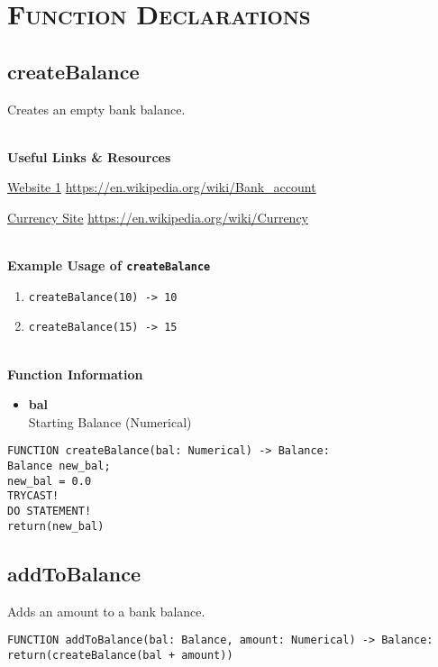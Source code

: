 
\section{\textsc{Function Declarations}}
\clearpage

\subsection{createBalance}
Creates an empty bank balance.


 \textbf{ \\ Useful Links \& Resources}

\href{https://en.wikipedia.org/wiki/Bank_account}{Website 1} \hfill \url{https://en.wikipedia.org/wiki/Bank_account} 

\href{https://en.wikipedia.org/wiki/Currency}{Currency Site} \hfill \url{https://en.wikipedia.org/wiki/Currency} 

\textbf{ \\ Example Usage of \texttt{createBalance}}
\begin{enumerate}
	\setlength{\itemsep}{0pt}
	\setlength{\parskip}{0pt}
	\setlength{\parsep}{0pt}
	\item \verb|createBalance(10) -> 10|
	\item \verb|createBalance(15) -> 15|
\end{enumerate}

\textbf{ \\ Function Information}
\begin{itemize}
	\setlength{\itemsep}{0pt}
	\setlength{\parskip}{0pt}
	\setlength{\parsep}{0pt}
	\item \textbf{bal} \\ Starting Balance (Numerical)
\end{itemize}

\begin{verbatim}
FUNCTION createBalance(bal: Numerical) -> Balance:
Balance new_bal;
new_bal = 0.0
TRYCAST!
DO STATEMENT!
return(new_bal)
\end{verbatim}

\clearpage

\subsection{addToBalance}
Adds an amount to a bank balance.

\begin{verbatim}
FUNCTION addToBalance(bal: Balance, amount: Numerical) -> Balance:
return(createBalance(bal + amount))
\end{verbatim}

